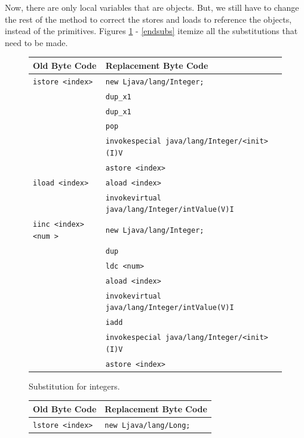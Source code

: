 Now, there are only local variables that are objects. But, we still have
to change the rest of the method to correct the stores and loads to
reference the objects, instead of the primitives.  
Figures \ref{subs} - \ref{endsubs} itemize all the substitutions
that need to be made.
\begin{center}
\begin{figure}[h]
\begin{tabular}{| l | l |}
   \hline
   Old Byte Code & Replacement Byte Code \\
   \hline
   \texttt{istore \textless index\textgreater} & \texttt{new Ljava/lang/Integer;} \\
      & \texttt{dup\_x1} \\
      & \texttt{dup\_x1} \\
      & \texttt{pop} \\
      & \texttt{invokespecial java/lang/Integer/\textless init\textgreater(I)V} \\
      & \texttt{astore \textless index\textgreater} \\
   \hline
   \texttt{iload \textless index\textgreater} & \texttt{aload \textless index\textgreater} \\
      & \texttt{invokevirtual java/lang/Integer/intValue(V)I} \\
   \hline
   \texttt{iinc \textless index\textgreater \textless num \textgreater}
      & \texttt{new Ljava/lang/Integer;}  \\
      & \texttt{dup}  \\
      & \texttt{ldc \textless num\textgreater}   \\
      & \texttt{aload \textless index\textgreater}   \\
      & \texttt{invokevirtual java/lang/Integer/intValue(V)I}  \\
      & \texttt{iadd}  \\
      & \texttt{invokespecial java/lang/Integer/\textless init\textgreater (I)V } \\      & \texttt{astore \textless index\textgreater}  \\
   \hline
\end{tabular}
\caption{Substitution for integers.}
\label{subs}
\end{figure}
\begin{figure}[htb]
\begin{tabular}{| l | l |}
   \hline
   Old Byte Code & Replacement Byte Code \\
   \hline
   \texttt{lstore \textless index\textgreater} & \texttt{new Ljava/lang/Long;} \\

\end{tabular}
\end{figure}
\end{center}
